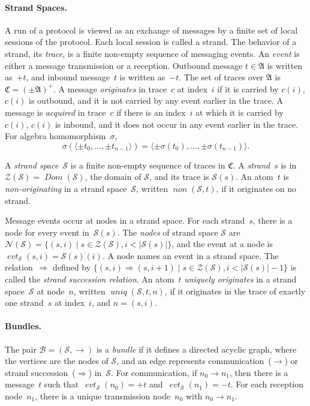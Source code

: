 \documentclass[12pt]{article}
\newcommand{\fn}[1]{\ensuremath{\operatorname{\mathit{#1}}}}
\newcommand{\sdom}{\fn{Dom}}
\newcommand{\seq}[1]{\ensuremath{\langle#1\rangle}}
\newcommand{\inbnd}{\mathord -}
\newcommand{\outbnd}{\mathord +}
\newcommand{\alg}[1]{\ensuremath{\mathfrak{#1}}}
\newcommand{\msg}{\alg{A}}
\newcommand{\ssp}{\ensuremath{\mathcal{S}}}
\newcommand{\bun}{\ensuremath{\mathcal{B}}}
\newcommand{\strands}{\ensuremath{\mathcal{Z}}}
\newcommand{\nodes}{\ensuremath{\mathcal{N}}}
\newcommand{\tr}{\ensuremath{\mathfrak C}}
\newcommand{\evt}{\fn{evt}}
\begin{document}
\paragraph{Strand Spaces.}
A run of a protocol is viewed as an exchange of messages by a finite
set of local sessions of the protocol.  Each local session is called a
strand.  The behavior of a strand, its \emph{trace}, is a finite
non-empty sequence of messaging events.  An \emph{event} is either a
message transmission or a reception.  Outbound message $t\in\msg$ is
written as~$\outbnd t$, and inbound message~$t$ is written as~$\inbnd
t$.  The set of traces over $\msg$ is $\tr=(\pm\msg)^+$.  A message
\emph{originates} in trace~$c$ at index~$i$ if it is carried by
$c(i)$, $c(i)$ is outbound, and it is not carried by any event earlier
in the trace.  A message is \emph{acquired} in trace~$c$ if there is
an index~$i$ at which it is carried by $c(i)$, $c(i)$ is inbound, and
it does not occur in any event earlier in the trace.  For algebra
homomorphism~$\sigma$, \[\sigma (\seq{\pm t_0,\ldots,\pm t_{n-1}})=
\seq{\pm \sigma(t_0),\ldots,\pm \sigma(t_{n-1})}.\]

A \emph{strand space}~{\ssp} is a finite non-empty sequence of traces
in $\tr$.  A \emph{strand}~$s$ is in $\strands(\ssp)=\sdom(\ssp)$, the
domain of $\ssp$, and its trace is $\ssp(s)$.  An atom~$t$ is
\emph{non-originating} in a strand space~$\ssp$, written
$\fn{non}(\ssp,t)$, if it originates on no strand.

Message events occur at nodes in a strand space.  For each strand~$s$,
there is a node for every event in~$\ssp(s)$.  The \emph{nodes} of
strand space $\ssp$ are $\nodes(\ssp)=\{(s,i)\mid s\in\strands(\ssp),
i < |\ssp(s)|\}$, and the event at a node is
$\evt_\ssp(s,i)=\ssp(s)(i)$.  A node names an event in a strand space.
The relation~$\Rightarrow$ defined by $\{(s,i)\Rightarrow(s,i+1)\mid
s\in\strands(\ssp), i<|\ssp(s)|-1\}$ is called the \emph{strand
  succession relation}.  An atom~$t$ \emph{uniquely originates} in a
strand space~$\ssp$ at node~$n$, written $\fn{uniq}(\ssp,t,n)$, if it
originates in the trace of exactly one strand~$s$ at index~$i$, and
$n=(s,i)$.

\paragraph{Bundles.}
The pair $\bun=(\ssp,\to)$ is a \emph{bundle} if it defines a directed
acyclic graph, where the vertices are the nodes of $\ssp$, and an edge
represents communication~($\rightarrow$) or strand
succession~($\Rightarrow$) in~$\ssp$.  For communication, if
$n_0\rightarrow n_1$, then there is a message~$t$ such
that~$\evt_\ssp(n_0)=\outbnd t$ and~$\evt_\ssp(n_1)=\inbnd t$.  For
each reception node~$n_1$, there is a unique transmission node~$n_0$
with $n_0\rightarrow n_1$.
\end{document}
